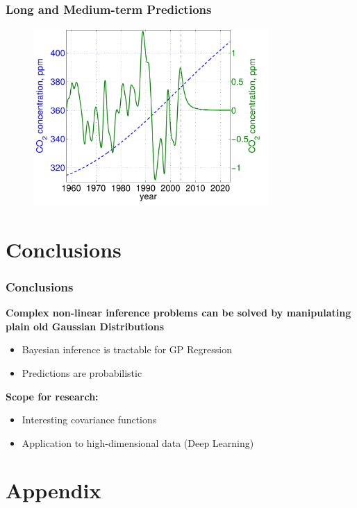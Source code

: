 \documentclass[10pt]{beamer}
\begin{document}
  \begin{frame}
    \frametitle{Long and Medium-term Predictions}

    \begin{figure}
      \centering
      \includegraphics[width=0.8\textwidth]{prediction3.png}
    \end{figure}
  \end{frame}

  \section{Conclusions}

  \begin{frame}
    \frametitle{Conclusions}

    \textbf{Complex non-linear inference problems can be solved by manipulating plain old Gaussian Distributions}

    \begin{itemize}
      \item Bayesian inference is tractable for GP Regression
      \item Predictions are probabilistic
    \end{itemize}

    \textbf{Scope for research:}

    \begin{itemize}
      \item Interesting covariance functions
      \item Application to high-dimensional data (Deep Learning)
    \end{itemize}

  \end{frame}

  \section{Appendix}
\end{document}
